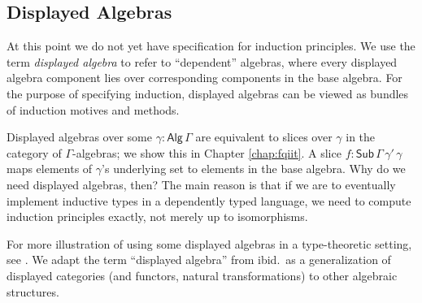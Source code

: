 \documentclass[12pt,a4paper,twoside,openany]{book}
\theoremstyle{remark}
\theoremstyle{definition}
\theoremstyle{theorem}
\newcommand{\ms}[1]{\mathsf{#1}}
\newcommand{\Sub}{\mathsf{Sub}}
\newcommand{\Alg}{\ms{Alg}}
\begin{document}
\subsection{Displayed Algebras}

At this point we do not yet have specification for induction principles. We use
the term \emph{displayed algebra} to refer to ``dependent'' algebras, where
every displayed algebra component lies over corresponding components in the base
algebra. For the purpose of specifying induction, displayed algebras can be
viewed as bundles of induction motives and methods.

Displayed algebras over some $\gamma : \Alg\,\Gamma$ are equivalent to slices
over $\gamma$ in the category of $\Gamma$-algebras; we show this in Chapter
\ref{chap:fqiit}. A slice $f : \Sub\,\Gamma\,\gamma'\,\gamma$ maps elements of
$\gamma$'s underlying set to elements in the base algebra. Why do we need
displayed algebras, then? The main reason is that if we are to eventually
implement inductive types in a dependently typed language, we need to compute
induction principles exactly, not merely up to isomorphisms.

For more illustration of using some displayed algebras in a type-theoretic
setting, see \cite{displayedcats}. We adapt the term ``displayed algebra'' from
ibid.\ as a generalization of displayed categories (and functors, natural
transformations) to other algebraic structures.
\end{document}
